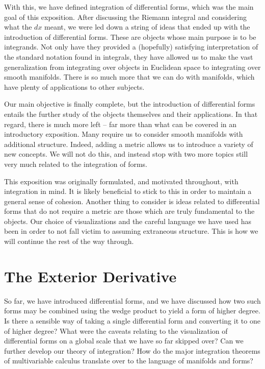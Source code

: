 \documentclass[a4paper,12pt]{article}
\begin{document}
With this, we have defined integration of differential forms, which was the main goal of this exposition.
After discussing the Riemann integral and considering what the $dx$ meant, we were led down a string of ideas that ended up with the introduction of differential forms.
These are objects whose main purpose is to be integrands.
Not only have they provided a (hopefully) satisfying interpretation of the standard notation found in integrals, they have allowed us to make the vast generalization from integrating over objects in Euclidean space to integrating over smooth manifolds.
There is so much more that we can do with manifolds, which have plenty of applications to other subjects.

Our main objective is finally complete, but the introduction of differential forms entails the further study of the objects themselves and their applications.
In that regard, there is much more left -- far more than what can be covered in an introductory exposition.
Many require us to consider smooth manifolds with additional structure.
Indeed, adding a metric allows us to introduce a variety of new concepts.
We will not do this, and instead stop with two more topics still very much related to the integration of forms.

This exposition was originally formulated, and motivated throughout, with integration in mind.
It is likely beneficial to stick to this in order to maintain a general sense of cohesion.
Another thing to consider is ideas related to differential forms that do not require a metric are those which are truly fundamental to the objects.
Our choice of visualizations and the careful language we have used has been in order to not fall victim to assuming extraneous structure.
This is how we will continue the rest of the way through.

\section{The Exterior Derivative}

So far, we have introduced differential forms, and we have discussed how two such forms may be combined using the wedge product to yield a form of higher degree.
Is there a sensible way of taking a single differential form and converting it to one of higher degree?
What were the caveats relating to the visualization of differential forms on a global scale that we have so far skipped over?
Can we further develop our theory of integration?
How do the major integration theorems of multivariable calculus translate over to the language of manifolds and forms?
\end{document}
